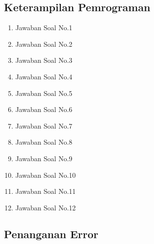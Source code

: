 \subsection{Keterampilan Pemrograman}
\begin{enumerate}
	\item Jawaban Soal No.1
	
	
	\item Jawaban Soal No.2
	
	
	\item Jawaban Soal No.3
	
	
	\item Jawaban Soal No.4
	
	
	\item Jawaban Soal No.5
	
	
	\item Jawaban Soal No.6
	
	
	\item Jawaban Soal No.7
	
	
	\item Jawaban Soal No.8
	
	
	\item Jawaban Soal No.9
	
	
	\item Jawaban Soal No.10
	
	
	\item Jawaban Soal No.11
	
	
	\item Jawaban Soal No.12
	
\end{enumerate}

\subsection{Penanganan Error}


